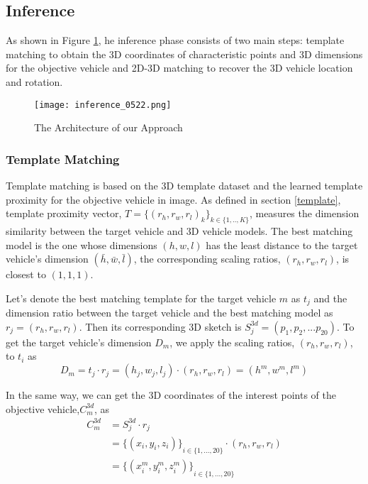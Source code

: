 \subsection{Inference}
\label{inference}

As shown in Figure \ref{figure:inference}, he inference phase consists of two main steps: template matching to obtain the 3D coordinates of characteristic points and 3D dimensions for the objective vehicle and 2D-3D matching to recover the 3D vehicle location and rotation.

\begin{figure}[h]		
	\texttt{[image: inference\_0522.png]}
	\caption{The Architecture of our Approach}
	\centering
	\label{figure:inference}
\end{figure}

\subsubsection{Template Matching}

Template matching is based on the 3D template dataset and the learned template proximity for the objective vehicle in image. As defined in section \ref{template}, template proximity vector, ${T} = \{{(r_h,r_w,r_l)}_k\}_{k \in \{1,.., K\}}$, measures the dimension similarity between the target vehicle and 3D vehicle models. The best matching model is the one whose dimensions $(h, w, l)$ has the least distance to the target vehicle's dimension $(\bar{h}, \bar{w}, \bar{l})$, \ie the corresponding scaling ratios, $(r_h,r_w,r_l)$, is closest to $(1, 1, 1)$. 

Let's denote the best matching template for the target vehicle $m$ as $t_j$ and the dimension ratio between the target vehicle and the best matching model as $r_j = (r_h,r_w,r_l)$. Then its corresponding 3D sketch is $S_j^{3d}  = (p_1, p_2, ... p_{20})$. To get the target vehicle's dimension $D_m$, we apply the scaling ratios, $(r_h,r_w,r_l)$, to $t_i$ as
\begin{equation}
	D_m = t_j \cdot r_j =  (h_j, w_j, l_j) \cdot (r_h,r_w,r_l) = (h^m, w^m, l^m)
\end{equation}

In the same way, we can get the 3D coordinates of the interest points of the objective vehicle,$C_m^{3d}$, as
\begin{align}
C_m^{3d} &= S_j^{3d} \cdot r_j \nonumber \\  
					  &=  {\{(x_i, y_i, z_i)\}}_{i \in \{1, ...,20\}} \cdot (r_h,r_w,r_l) \nonumber \\  
					  &= {\{(x_i^m, y_i^m, z_i^m)\}}_{i \in \{1, ...,20\}} \qquad {} 
\end{align}

